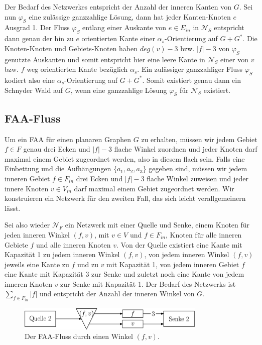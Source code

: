 Der Bedarf des Netzwerkes entspricht der Anzahl der inneren Kanten von $G$. Sei nun $\varphi_S$ eine zulässige ganzzahlige Lösung, dann hat jeder Kanten-Knoten $e$ Ausgrad 1. Der Fluss $\varphi_S$ entlang einer Auskante von $e \in E_{in}$ in $\mathcal{N}_S$ entspricht dann genau der hin zu $e$ orientierten Kante einer $\alpha_{s}$-Orientierung auf $G+G^*$. Die Knoten-Knoten und Gebiets-Knoten haben $deg(v)-3$ bzw. $|f|-3$ von $\varphi_S$ genutzte Auskanten und somit entspricht hier eine leere Kante in $\mathcal{N}_S$ einer von $v$ bzw. $f$ weg orientierten Kante bezüglich $\alpha_{s}$. Ein zulässiger ganzzahliger Fluss $\varphi_S$ kodiert also eine $\alpha_s$-Orientierung auf $G+G^*$. Somit existiert genau dann ein Schnyder Wald auf $G$, wenn eine ganzzahlige Lösung $\varphi_S$ für $\mathcal{N}_S$ existiert.

\subsection{FAA-Fluss}\label{faa-flow}

Um ein FAA für einen planaren Graphen $G$ zu erhalten, müssen wir jedem Gebiet $f \in F$ genau drei Ecken und $|f|-3$ flache Winkel zuordnen und jeder Knoten darf maximal einem Gebiet zugeordnet werden, also in diesem flach sein. Falls eine Einbettung und die Aufhängungen $\{a_1,a_2,a_3\}$ gegeben sind, müssen wir jedem inneren Gebiet $f \in F_{in}$ drei Ecken und $|f|-3$ flache Winkel zuweisen und jeder innere Knoten $v \in V_{in}$ darf maximal einem Gebiet zugeordnet werden. Wir konstruieren ein Netzwerk für den zweiten Fall, das sich leicht verallgemeinern lässt.\

Sei also wieder $\mathcal{N}_F$ ein Netzwerk mit einer Quelle und Senke, einem Knoten für jeden inneren Winkel $(f,v)$, mit $v\in V$ und $f \in F_{in}$, Knoten für alle inneren Gebiete $f$ und alle inneren Knoten $v$. Von der Quelle existiert eine Kante mit Kapazität 1 zu jedem inneren Winkel $(f,v)$, von jedem inneren Winkel $(f,v)$ jeweils eine Kante zu $f$ und zu $v$ mit Kapazität 1, von jedem inneren Gebiet $f$ eine Kante mit Kapazität 3 zur Senke und zuletzt noch eine Kante von jedem inneren Knoten $v$ zur Senke mit Kapazität 1. Der Bedarf des Netzwerks ist $\sum_{f \in F_{in}}{|f|}$ und entspricht der Anzahl der inneren Winkel von $G$. 

\begin{figure}[h]
	\centering
  \includegraphics[width=0.8\textwidth]{faa_flow.png}
  \caption{Der FAA-Fluss durch einen Winkel $(f,v)$.}
  \label{faa_flow}
\end{figure}


